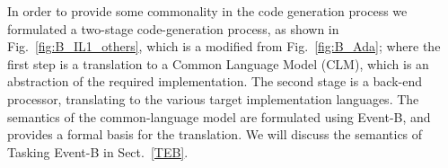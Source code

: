 %
In order to provide some commonality in the code generation process we formulated a two-stage code-generation process, as shown in Fig.~\ref{fig:B_IL1_others}, which is a modified from Fig.~\ref{fig:B_Ada}; where the first step is a translation to a Common Language Model (CLM), which is an abstraction of the required implementation. The second stage is a back-end processor, translating to the various target implementation languages. The semantics of the common-language model are formulated using Event-B, and provides a formal basis for the translation. We will discuss the semantics of Tasking Event-B in Sect.~\ref{TEB}.
